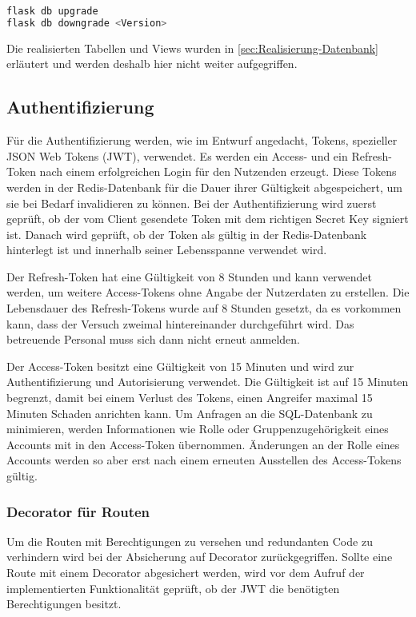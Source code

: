 \begin{lstlisting}[language=bash, frame=single, caption={GIS Nutzung eines Migrationsskripts}, captionpos=b, label={lst:gis-use-migration}]
flask db upgrade
flask db downgrade <Version>
\end{lstlisting}

Die realisierten Tabellen und Views wurden in \autoref{sec:Realisierung-Datenbank} erläutert und werden deshalb hier nicht weiter aufgegriffen.

\subsection{Authentifizierung}\label{sub:realisierung-authentifizierung}

Für die Authentifizierung werden, wie im Entwurf angedacht, Tokens, spezieller JSON Web Tokens (JWT), verwendet. Es werden ein Access- und ein Refresh-Token nach einem erfolgreichen Login für den Nutzenden erzeugt. Diese Tokens werden in der Redis-Datenbank für die Dauer ihrer Gültigkeit abgespeichert, um sie bei Bedarf invalidieren zu können. Bei der Authentifizierung wird zuerst geprüft, ob der vom Client gesendete Token mit dem richtigen Secret Key signiert ist. Danach wird geprüft, ob der Token als gültig in der Redis-Datenbank hinterlegt ist und innerhalb seiner Lebensspanne verwendet wird.

Der Refresh-Token hat eine Gültigkeit von 8 Stunden und kann verwendet werden, um weitere Access-Tokens ohne Angabe der Nutzerdaten zu erstellen. Die Lebensdauer des Refresh-Tokens wurde auf 8 Stunden gesetzt, da es vorkommen kann, dass der Versuch zweimal hintereinander durchgeführt wird. Das betreuende Personal muss sich dann nicht erneut anmelden.

Der Access-Token besitzt eine Gültigkeit von 15 Minuten und wird zur Authentifizierung und Autorisierung verwendet. Die Gültigkeit ist auf 15 Minuten begrenzt, damit bei einem Verlust des Tokens, einen Angreifer maximal 15 Minuten Schaden anrichten kann. Um Anfragen an die SQL-Datenbank zu minimieren, werden Informationen wie Rolle oder Gruppenzugehörigkeit eines Accounts mit in den Access-Token übernommen. Änderungen an der Rolle eines Accounts werden so aber erst nach einem erneuten Ausstellen des Access-Tokens gültig.

\subsubsection{Decorator für Routen}
Um die Routen mit Berechtigungen zu versehen und redundanten Code zu verhindern wird bei der Absicherung auf Decorator zurückgegriffen. Sollte eine Route mit einem Decorator abgesichert werden, wird vor dem Aufruf der implementierten Funktionalität geprüft, ob der JWT die benötigten Berechtigungen besitzt.

